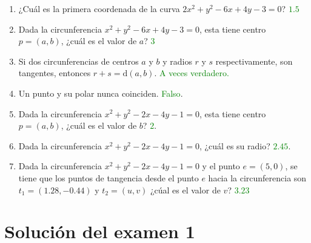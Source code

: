 \documentclass{article}
\theoremstyle{definicion}
\theoremstyle{definition}             %
\theoremstyle{definition}             %
\theoremstyle{definition}
\theoremstyle{definition}
\theoremstyle{observacion}
\theoremstyle{definition}
\theoremstyle{plain}
\theoremstyle{definition}
\theoremstyle{afirmacion}
\theoremstyle{notation}
\theoremstyle{definition}
\begin{document}
        \begin{enumerate}[label = Preg. \arabic*.]
            \item ¿Cuál es la primera coordenada de la curva \(2x^{2} + y^{2} - 6x +4y -3 = 0\)? \textcolor{green}{\(1.5\)}
            \item Dada la circunferencia \(x^{2} + y^{2} - 6x + 4y - 3 = 0\), esta tiene centro \(p = (a, b)\), ¿cuál es el valor de \(a\)? \textcolor{green}{\(3\)}
            \item Si dos circunferencias de centros \(a\) y \(b\) y radios \(r\) y \(s\) respectivamente, son tangentes, entonces \(r + s = \textrm{d}(a, b)\). \textcolor{green}{A veces verdadero.}
            \item Un punto y su polar nunca coinciden. \textcolor{green}{Falso}.
            \item Dada la circunferencia \(x^{2} + y^{2} - 2x - 4y - 1 = 0\), esta tiene centro \(p = (a, b)\), ¿cuál es el valor de \(b\)? \textcolor{green}{\(2\)}.
            \item Dada la circunferencia \(x^{2} + y^{2} - 2x - 4y - 1 = 0\), ¿cuál es su radio? \textcolor{green}{\(2.45\)}.
            \item Dada la circunferencia \(x^{2} + y^{2} - 2x - 4y - 1 = 0\) y el punto \(e = (5, 0)\), se tiene que los puntos de tangencia desde el punto \(e\) hacia la circunferencia son \(t_{1} = (1.28, -0.44)\) y \(t_{2} = (u, v)\) ¿cúal es el valor de \(v\)? \textcolor{green}{\(3.23\)}
        \end{enumerate}

        \section{Solución del examen 1}
\end{document}
